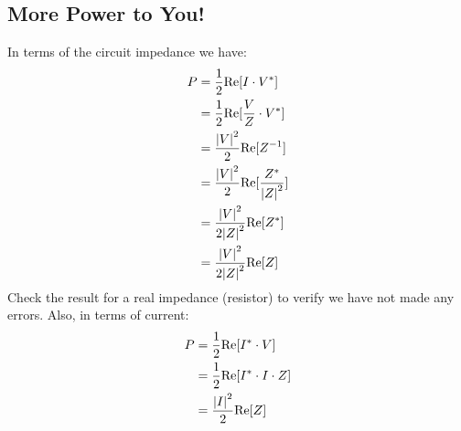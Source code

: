 \subsection{More Power to You!}
In terms of the circuit impedance we have:
    \begin{align*}
        P &= \frac{1}{2}{\mathop{\rm Re}\nolimits} [I \cdot {V^*}]\\
        &= \frac{1}{2}{\mathop{\rm Re}\nolimits} [\frac{V}{Z} \cdot {V^*}]\\
        &= \frac{{{{\left| V \right|}^2}}}{2}{\mathop{\rm Re}\nolimits} [{Z^{ - 1}}]\\
        &= \frac{{{{\left| V \right|}^2}}}{2}{\mathop{\rm Re}\nolimits} [\frac{{{Z^*}}}{{{{\left| Z \right|}^2}}}]\\
        &= \frac{{{{\left| V \right|}^2}}}{{2{{\left| Z \right|}^2}}}{\mathop{\rm Re}\nolimits} [{Z^*}]\\
        &= \frac{{{{\left| V \right|}^2}}}{{2{{\left| Z \right|}^2}}}{\mathop{\rm Re}\nolimits} [Z]
    \end{align*}
Check the result for a real impedance (resistor) to verify we have not made any errors.   Also, in terms of current:
    \begin{align*}
        P &= \frac{1}{2}{\mathop{\rm Re}\nolimits} [{I^*} \cdot V]\\
        &= \frac{1}{2}{\mathop{\rm Re}\nolimits} [{I^*} \cdot I \cdot Z]\\
        &= \frac{{{{\left| I \right|}^2}}}{2}{\mathop{\rm Re}\nolimits} [Z]
    \end{align*}
\newpage
